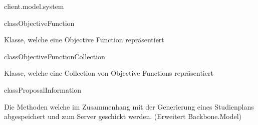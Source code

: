 \begin{texdocpackage}{client.model.system}
\begin{texdocclass}{class}{ObjectiveFunction}
\label{texdoclet:edu.kit.informatik.studyplan.client.model.system.ObjectiveFunction}
\begin{texdocclassintro}
Klasse, welche eine Objective Function repräsentiert\end{texdocclassintro}
\begin{texdocclassconstructors}
\end{texdocclassconstructors}
\end{texdocclass}


\begin{texdocclass}{class}{ObjectiveFunctionCollection}
\label{texdoclet:edu.kit.informatik.studyplan.client.model.system.ObjectiveFunctionCollection}
\begin{texdocclassintro}
Klasse, welche eine Collection von Objective Functions repräsentiert\end{texdocclassintro}
\begin{texdocclassconstructors}
\end{texdocclassconstructors}
\end{texdocclass}


\begin{texdocclass}{class}{ProposalInformation}
\label{texdoclet:edu.kit.informatik.studyplan.client.model.system.ProposalInformation}
\begin{texdocclassintro}
Die Methoden welche im Zusammenhang mit der Generierung eines Studienplans
 abgespeichert und zum Server geschickt werden. (Erweitert Backbone.Model)\end{texdocclassintro}
\begin{texdocclassconstructors}
\end{texdocclassconstructors}
\end{texdocclass}



\end{texdocpackage}
